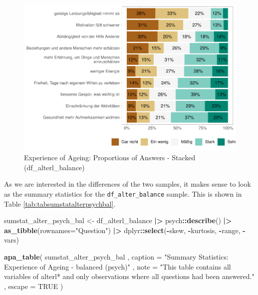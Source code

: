 \documentclass[
  doc]{apa6}
\newenvironment{Shaded}{\begin{snugshade}}{\end{snugshade}}
\newcommand{\AttributeTok}[1]{\textcolor[rgb]{0.13,0.29,0.53}{#1}}
\newcommand{\ConstantTok}[1]{\textcolor[rgb]{0.56,0.35,0.01}{#1}}
\newcommand{\FunctionTok}[1]{\textcolor[rgb]{0.13,0.29,0.53}{\textbf{#1}}}
\newcommand{\NormalTok}[1]{#1}
\newcommand{\OtherTok}[1]{\textcolor[rgb]{0.56,0.35,0.01}{#1}}
\newcommand{\SpecialCharTok}[1]{\textcolor[rgb]{0.81,0.36,0.00}{\textbf{#1}}}
\newcommand{\StringTok}[1]{\textcolor[rgb]{0.31,0.60,0.02}{#1}}
\begin{document}
\begin{figure}
\centering
\includegraphics{desc_NRW80_files/figure-latex/likertalterl4-1.pdf}
\caption{\label{fig:likertalterl4}Experience of Ageing: Proportions of Answers - Stacked (df\_alterl\_balance)}
\end{figure}

As we are interested in the differences of the two samples, it makes sense to look as the summary statistics for the \texttt{df\_alter\_balance} sample. This is shown in Table \ref{tab:tabsumstatalterpsychbal}.

\begin{Shaded}
\begin{Highlighting}[]
\NormalTok{sumstat\_alter\_psych\_bal }\OtherTok{\textless{}{-}}\NormalTok{ df\_alterl\_balance }\SpecialCharTok{|\textgreater{}}
\NormalTok{  psych}\SpecialCharTok{::}\FunctionTok{describe}\NormalTok{() }\SpecialCharTok{|\textgreater{}} 
  \FunctionTok{as\_tibble}\NormalTok{(}\AttributeTok{rownames=}\StringTok{"Question"}\NormalTok{)  }\SpecialCharTok{|\textgreater{}} 
\NormalTok{  dplyr}\SpecialCharTok{::}\FunctionTok{select}\NormalTok{(}\SpecialCharTok{{-}}\NormalTok{skew, }\SpecialCharTok{{-}}\NormalTok{kurtosis, }\SpecialCharTok{{-}}\NormalTok{range, }\SpecialCharTok{{-}}\NormalTok{vars) }

\FunctionTok{apa\_table}\NormalTok{(}
\NormalTok{  sumstat\_alter\_psych\_bal}
\NormalTok{  , }\AttributeTok{caption =} \StringTok{"Summary Statistics: Experience of Ageing {-} balanced (psych)"}
\NormalTok{  , }\AttributeTok{note =} \StringTok{"This table contains all variables of \textasciigrave{}alterl*\textasciigrave{} and only observations where all questions had been answered."}
\NormalTok{  , }\AttributeTok{escape =} \ConstantTok{TRUE}
\NormalTok{)}
\end{Highlighting}
\end{Shaded}
\end{document}
